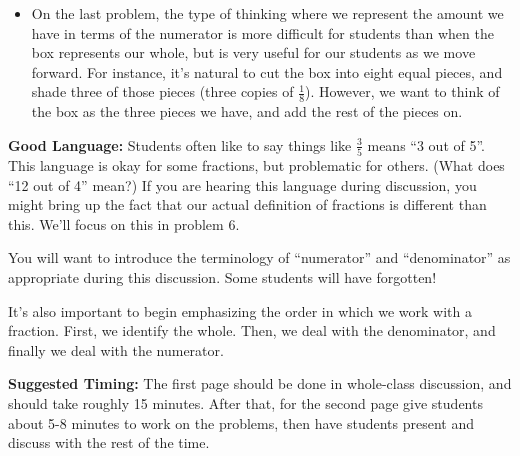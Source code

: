 \documentclass[nooutcomes,noauthor,handout]{ximera}
\begin{document}
\begin{instructorNotes}
\begin{itemize}
	\item On the last problem, the type of thinking where we represent the amount we have in terms of the numerator is more difficult for students than when the box represents our whole, but is very useful for our students as we move forward. For instance, it's natural to cut the box into eight equal pieces, and shade three of those pieces (three copies of $\frac18$). However, we want to think of the   box as the three pieces we have, and add the rest of the pieces on.
\end{itemize}



{\bf Good Language:} Students often like to say things like $\frac{3}{5}$ means ``3 out of 5''. This language is okay for some fractions, but problematic for others. (What does ``12 out of 4'' mean?) If you are hearing this language during discussion, you might bring up the fact that our actual definition of fractions is different than this. We'll focus on this in problem 6.

You will want to introduce the terminology of ``numerator'' and ``denominator'' as appropriate during this discussion. Some students will have forgotten!

It's also important to begin emphasizing the order in which we work with a fraction. First, we identify the whole. Then, we deal with the denominator, and finally we deal with the numerator. 



{\bf Suggested Timing:} The first page should be done in whole-class discussion, and should take roughly 15 minutes. After that, for the second page give students about 5-8 minutes to work on the problems, then have students present and discuss with the rest of the time.

\end{instructorNotes}
\end{document}
